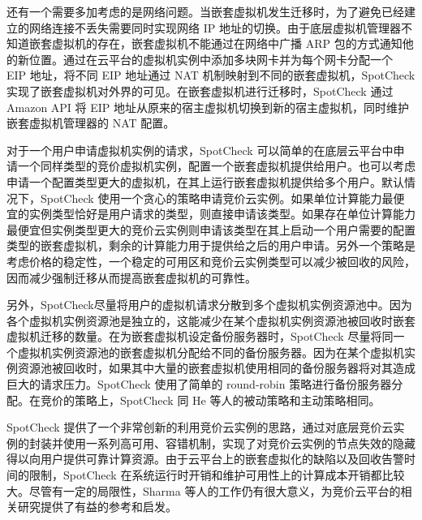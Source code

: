 还有一个需要多加考虑的是网络问题。当嵌套虚拟机发生迁移时，为了避免已经建立的网络连接不丢失需要同时实现网络 IP 地址的切换。由于底层虚拟机管理器不知道嵌套虚拟机的存在，嵌套虚拟机不能通过在网络中广播 ARP 包的方式通知他的新位置。通过在云平台的虚拟机实例中添加多块网卡并为每个网卡分配一个 EIP 地址，将不同 EIP 地址通过 NAT 机制映射到不同的嵌套虚拟机，SpotCheck 实现了嵌套虚拟机对外界的可见。在嵌套虚拟机进行迁移时，SpotCheck 通过 Amazon API 将 EIP 地址从原来的宿主虚拟机切换到新的宿主虚拟机，同时维护嵌套虚拟机管理器的 NAT 配置。

对于一个用户申请虚拟机实例的请求，SpotCheck 可以简单的在底层云平台中申请一个同样类型的竞价虚拟机实例，配置一个嵌套虚拟机提供给用户。也可以考虑申请一个配置类型更大的虚拟机，在其上运行嵌套虚拟机提供给多个用户。默认情况下，SpotCheck 使用一个贪心的策略申请竞价云实例。如果单位计算能力最便宜的实例类型恰好是用户请求的类型，则直接申请该类型。如果存在单位计算能力最便宜但实例类型更大的竞价云实例则申请该类型在其上启动一个用户需要的配置类型的嵌套虚拟机，剩余的计算能力用于提供给之后的用户申请。另外一个策略是考虑价格的稳定性，一个稳定的可用区和竞价云实例类型可以减少被回收的风险，因而减少强制迁移从而提高嵌套虚拟机的可靠性。

另外，SpotCheck尽量将用户的虚拟机请求分散到多个虚拟机实例资源池中。因为各个虚拟机实例资源池是独立的，这能减少在某个虚拟机实例资源池被回收时嵌套虚拟机迁移的数量。在为嵌套虚拟机设定备份服务器时，SpotCheck 尽量将同一个虚拟机实例资源池的嵌套虚拟机分配给不同的备份服务器。因为在某个虚拟机实例资源池被回收时，如果其中大量的嵌套虚拟机使用相同的备份服务器将对其造成巨大的请求压力。SpotCheck 使用了简单的 round-robin 策略进行备份服务器分配。在竞价的策略上，SpotCheck 同 He 等人的被动策略和主动策略相同。

SpotCheck 提供了一个非常创新的利用竞价云实例的思路，通过对底层竞价云实例的封装并使用一系列高可用、容错机制，实现了对竞价云实例的节点失效的隐藏得以向用户提供可靠计算资源。由于云平台上的嵌套虚拟化的缺陷以及回收告警时间的限制，SpotCheck 在系统运行时开销和维护可用性上的计算成本开销都比较大。尽管有一定的局限性，Sharma 等人的工作仍有很大意义，为竞价云平台的相关研究提供了有益的参考和启发。

